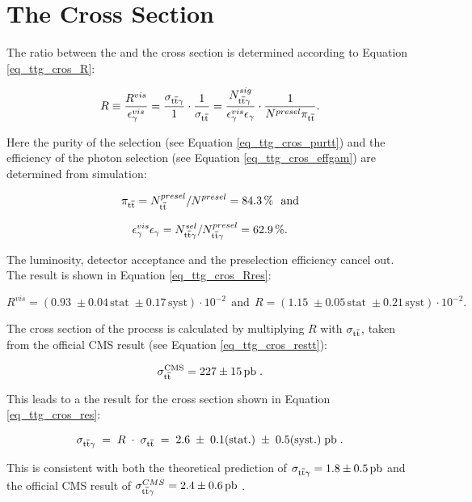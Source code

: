\section{The \ttgamma Cross Section}
\label{sec_ttg_crossec}

The ratio between the \ttbar and the \ttgamma cross section is determined according to Equation \ref{eq_ttg_cros_R}:

\begin{equation}
R \equiv \frac{R^{vis}}{\epsilon^{vis}_{\gamma}} = \frac{\sigma_{\mathrm{t}\overline{\mathrm{t}} \gamma}}{1} \cdot \frac{1}{\sigma_{\mathrm{t}\overline{\mathrm{t}}}} = \frac{N^{sig}_{\mathrm{t}\overline{\mathrm{t}} \gamma}}{\epsilon^{vis}_{\gamma} \epsilon_{\gamma}} \cdot \frac{1}{N^{presel} \pi_{\mathrm{t}\overline{\mathrm{t}}}}.
\label{eq_ttg_cros_R}
\end{equation}

Here the purity of the \ttbar selection (see Equation \ref{eq_ttg_cros_purtt}) and the efficiency of the photon selection (see Equation \ref{eq_ttg_cros_effgam}) are determined from simulation:

\begin{equation}
\pi_{\mathrm{t}\overline{\mathrm{t}}} = N_{\mathrm{t}\overline{\mathrm{t}}}^{presel} / N^{presel} = \SI{84.3}{\percent} ~~\mathrm{and}
\label{eq_ttg_cros_purtt}
\end{equation}

\begin{equation}
\epsilon_{\gamma}^{vis} \epsilon_{\gamma} = N_{\mathrm{t}\overline{\mathrm{t}} \gamma}^{sel} / N_{\mathrm{t}\overline{\mathrm{t}} \gamma}^{presel} = \SI{62.9}{\percent}.
 \label{eq_ttg_cros_effgam}
\end{equation}

The luminosity, detector acceptance and the preselection efficiency cancel out. The result is shown in Equation \ref{eq_ttg_cros_Rres}:

\begin{equation}
R^{vis} = (0.93 \;\pm 0.04\,\mathrm{stat}\;\pm 0.17\,\mathrm{syst})\cdot 10^{-2} ~~\mathrm{and}~~ R = (1.15 \;\pm 0.05\,\mathrm{stat}\;\pm 0.21\,\mathrm{syst})\cdot 10^{-2}.
\label{eq_ttg_cros_Rres}
\end{equation}

The cross section of the \ttgamma process is calculated by multiplying $R$ with $\sigma_{\mathrm{t}\overline{\mathrm{t}}}$, taken from the official CMS result  \cite{CMS-PAS-TOP-12-007} (see Equation \ref{eq_ttg_cros_restt}):

\begin{equation}
\sigma_{\ttbar}^{\mathrm{CMS}} = \SI{227 \pm 15}{\pico \barn}\;.
\label{eq_ttg_cros_restt}
\end{equation}

This leads to a the result for the \ttgamma cross section shown in Equation \ref{eq_ttg_cros_res}:

\begin{equation}
\sigma_{\ttgamma} \;=\; R\;\cdot \;\sigma_{\ttbar} \; =\; 2.6\;\pm \;0.1\mathrm{ (stat.)} \;\pm \;0.5\mathrm{ (syst.)}\; \SI{}{\pico \barn}\;.
\label{eq_ttg_cros_res}
\end{equation}

This is consistent with both the theoretical prediction of $\sigma_{\ttgamma} = \SI{1.8 \pm 0.5}{\pico \barn}$ \cite{Melnikov:2011ta} and the official CMS result of $\sigma_{\ttgamma}^{CMS} = \SI{2.4\pm 0.6}{\pico \barn}$ \cite{CMS-PAS-TOP-13-011}.